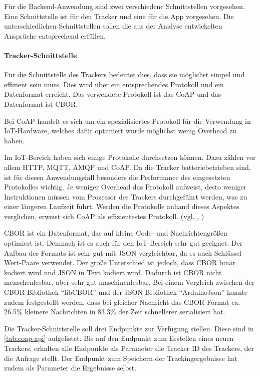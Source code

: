Für die Backend-Anwendung sind zwei verschiedene Schnittstellen vorgesehen.
Eine Schnittstelle ist für den Tracker und eine für die App vorgesehen.
Die unterschiedlichen Schnittstellen sollen die aus der Analyse entwickelten Ansprüche entsprechend erfüllen.

\paragraph{Tracker-Schnittstelle} \label{par:tracker-schnittstelle}
Für die Schnittstelle des Trackers bedeutet dies, dass sie möglichst simpel und effizient sein muss.
Dies wird über ein entsprechendes Protokoll und ein Datenformat erreicht.
Das verwendete Protokoll ist das \gls{CoAP} und das Datenformat ist \gls{CBOR}.

Bei \gls{CoAP} handelt es sich um ein spezialisiertes Protokoll für die Verwendung in
\gls{IoT}-Hardware, welches dafür optimiert wurde möglichst wenig \gls{Overhead} zu haben.

Im \gls{IoT}-Bereich haben sich einige Protokolle durchsetzen können. Dazu zählen vor allem
\gls{HTTP}, \gls{MQTT}, \gls{AMQP} und \gls{CoAP}.
Da die Tracker batteriebetrieben sind, ist für diesen Anwendungsfall besonders die Performance des
eingesetzten Protokolles wichtig. Je weniger Overhead das Protokoll aufweist, desto weniger
Instruktionen müssen vom Prozessor des Trackers durchgeführt werden, was zu einer längeren Laufzeit
führt.
Werden die Protokolle anhand dieses Aspektes verglichen, erweist sich \gls{CoAP} als effizientestes
Protokoll. (vgl. \cite{Dizdarevic2019}, \cite{Naik2017})

\gls{CBOR} ist ein Datenformat, das auf kleine Code- und Nachrichtengrößen optimiert ist.
Demnach ist es auch für den \gls{IoT}-Bereich sehr gut geeignet.
Der Aufbau des Formats ist sehr gut mit \gls{JSON} vergleichbar, da es auch Schlüssel-Wert-Paare verwendet.
Der große Unterschied ist jedoch, dass \gls{CBOR} binär kodiert wird und \gls{JSON} in Text kodiert wird.
Dadurch ist \gls{CBOR} nicht menschenlesbar, aber sehr gut maschinenlesbar.
Bei einem Vergleich zwischen der \gls{CBOR} Bibliothek \enquote{libCBOR} und der \gls{JSON} Bibliothek \enquote{ArduinoJson}
konnte zudem festgestellt werden, dass bei gleicher Nachricht das \gls{CBOR} Format ca. 26.5\% kleinere Nachrichten
in 83.3\% der Zeit schnellerer serialisiert hat.

Die Tracker-Schnittstelle soll drei Endpunkte zur Verfügung stellen.
Diese sind in \autoref{tab:coap-api} aufgelistet.
Bis auf den Endpunkt zum Erstellen eines neuen Trackers, erhalten alle Endpunkte als Parameter die Tracker ID des Trackers, der die Anfrage stellt.
Der Endpunkt zum Speichern der Trackingergebnisse hat zudem als Parameter die Ergebnisse selbst.

